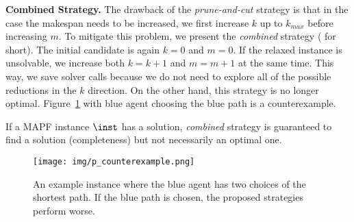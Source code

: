 \textbf{Combined Strategy.}
%
The drawback of the \emph{prune-and-cut} strategy is that in the case the makespan needs to be increased, we first increase $k$ up to $k_{max}$ before increasing $m$. To mitigate this problem, we present the \emph{combined} strategy (\ssc{} for short). The initial candidate is again $k=0$ and $m=0$. If the relaxed instance is unsolvable, we increase both $k=k+1$ and $m=m+1$ at the same time. This way, we save solver calls because we do not need to explore all of the possible reductions in the $k$ direction. On the other hand, this strategy is no longer optimal. Figure~\ref{fig:p_counterexample} with blue agent choosing the blue path is a counterexample.
%
\begin{prop}\cite{AAMAS_corridors}
If a MAPF instance $\inst$ has a solution, \emph{combined} strategy is guaranteed to find a solution (completeness) but not necessarily an optimal one.
\end{prop}
%
%
\begin{figure}[ht]
\centering
\texttt{[image: img/p\_counterexample.png]}
\caption{An example instance where the blue agent has two choices of the shortest path. If the blue path is chosen, the proposed strategies perform worse.}
\label{fig:p_counterexample}
\end{figure}
%
